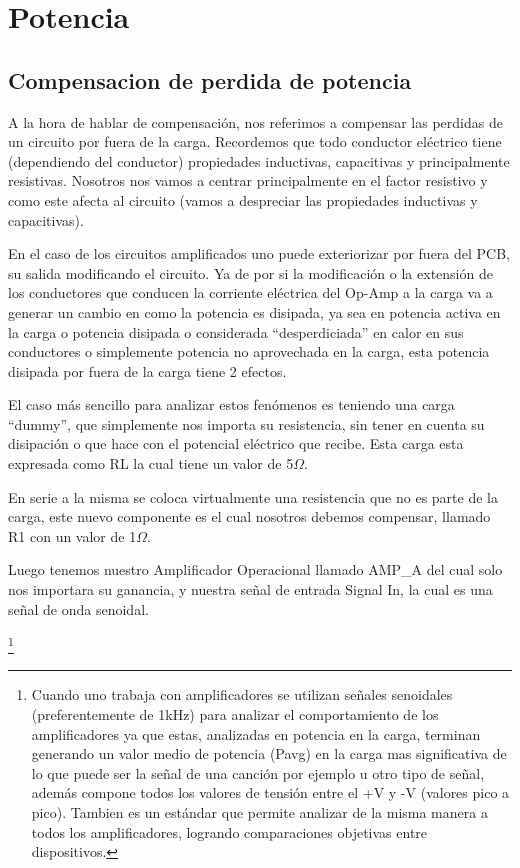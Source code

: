 \documentclass[../main.tex]{subfiles}
\begin{document}
\graphicspath{{../imagenes/potencia/}}
\section{Potencia}
	\subsection{Compensacion de perdida de potencia}
	A la hora de hablar de compensación, nos referimos a compensar las perdidas de un
	circuito por fuera de la carga. Recordemos que todo conductor eléctrico tiene 
	(dependiendo del conductor) propiedades inductivas, capacitivas y 
	principalmente resistivas. Nosotros nos vamos a centrar principalmente en el 
	factor resistivo y como este afecta al circuito (vamos a despreciar las 
	propiedades inductivas y capacitivas).

	En el caso de los circuitos amplificados uno puede exteriorizar por fuera del PCB, 
	su salida modificando el circuito. Ya de por si la modificación o la extensión de 
	los conductores que conducen la corriente eléctrica del Op-Amp a la carga va a 
	generar un cambio en como la potencia es disipada, ya sea en potencia activa en la 
	carga o potencia disipada o considerada ``desperdiciada'' en calor en sus 
	conductores o simplemente potencia no aprovechada en la carga, esta potencia 
	disipada por fuera de la carga tiene 2 efectos.

	El caso más sencillo para analizar estos fenómenos es teniendo una carga ``dummy'', 
	que simplemente nos importa su resistencia, sin tener en cuenta su disipación o 
	que hace con el potencial eléctrico que recibe. Esta carga esta expresada como RL 
	la cual tiene un valor de 5$\Omega$.

	En serie a la misma se coloca virtualmente una resistencia que no es parte de la 
	carga, este nuevo componente es el cual nosotros debemos compensar, llamado R1 con 
	un valor de 1$\Omega$.

	Luego tenemos nuestro Amplificador Operacional llamado AMP\_A del cual solo nos 
	importara su ganancia, y nuestra señal de entrada Signal In, la cual es una señal 
	de onda senoidal.
	
	\footnote{ Cuando uno trabaja con amplificadores se utilizan señales senoidales 
	(preferentemente de 1kHz) para analizar el comportamiento de los amplificadores 
	ya que estas, analizadas en potencia en la carga, terminan generando un valor 
	medio de potencia (Pavg) en la carga mas significativa de lo que puede ser la 
	señal de una canción por ejemplo u otro tipo de señal, además compone todos los 
	valores de tensión entre el +V y -V (valores pico a pico). Tambien es un 
	estándar que permite analizar de la misma manera a todos los amplificadores, 
	logrando comparaciones objetivas entre	dispositivos. }
\end{document}
